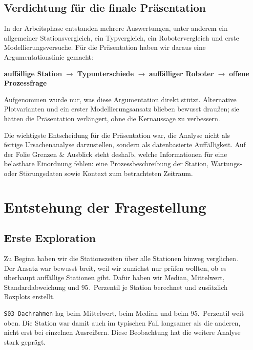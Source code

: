 \documentclass[a4paper, 11pt]{article}
\begin{document}
\subsection{Verdichtung für die finale Präsentation}

In der Arbeitsphase entstanden mehrere Auswertungen, unter anderem ein allgemeiner Stationsvergleich, ein Typvergleich, ein Robotervergleich und erste Modellierungsversuche. Für die Präsentation haben wir daraus eine Argumentationslinie gemacht:

\begin{center}
\textbf{auffällige Station} $\rightarrow$ \textbf{Typunterschiede} $\rightarrow$ \textbf{auffälliger Roboter} $\rightarrow$ \textbf{offene Prozessfrage}
\end{center}

Aufgenommen wurde nur, was diese Argumentation direkt stützt. Alternative Plotvarianten und ein erster Modellierungsansatz blieben bewusst draußen; sie hätten die Präsentation verlängert, ohne die Kernaussage zu verbessern.

Die wichtigste Entscheidung für die Präsentation war, die Analyse nicht als fertige Ursachenanalyse darzustellen, sondern als datenbasierte Auffälligkeit. Auf der Folie \glqq Grenzen \& Ausblick\grqq{} steht deshalb, welche Informationen für eine belastbare Einordnung fehlen: eine Prozessbeschreibung der Station, Wartungs- oder Störungsdaten sowie Kontext zum betrachteten Zeitraum.

\section{Entstehung der Fragestellung}

\subsection{Erste Exploration}

Zu Beginn haben wir die Stationszeiten über alle Stationen hinweg verglichen. Der Ansatz war bewusst breit, weil wir zunächst nur prüfen wollten, ob es überhaupt auffällige Stationen gibt. Dafür haben wir Median, Mittelwert, Standardabweichung und 95.\ Perzentil je Station berechnet und zusätzlich Boxplots erstellt.

\texttt{S03\_Dachrahmen} lag beim Mittelwert, beim Median und beim 95.\ Perzentil weit oben. Die Station war damit auch im typischen Fall langsamer als die anderen, nicht erst bei einzelnen Ausreißern. Diese Beobachtung hat die weitere Analyse stark geprägt.
\end{document}
